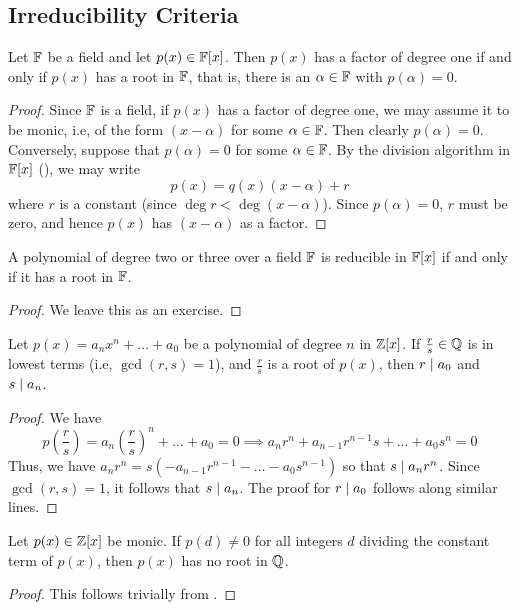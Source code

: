 \subsection{Irreducibility Criteria}

\begin{prop}
    Let $\mathbb{F}$ be a field and let $p(x) \in \mathbb{F}[x]$. Then $p(x)$ has a factor of degree one if and only if $p(x)$ has a root in $\mathbb{F}$, that is, there is an $\alpha \in \mathbb{F}$ with $p(\alpha) = 0$.
\end{prop}
\begin{proof}
    Since $\mathbb{F}$ is a field, if $p(x)$ has a factor of degree one, we may assume it to be monic, i.e, of the form $(x-\alpha)$ for some $\alpha \in \mathbb{F}$. Then clearly $p(\alpha) = 0$. Conversely, suppose that $p(\alpha) = 0$ for some $\alpha \in \mathbb{F}$. By the division algorithm in $\mathbb{F}[x]$ (), we may write
    \[
        p(x) = q(x) (x-\alpha) + r
    \]
    where $r$ is a constant (since $\deg r < \deg (x-\alpha)$). Since $p(\alpha) = 0$, $r$ must be zero, and hence $p(x)$ has $(x-\alpha)$ as a factor.
\end{proof}

\begin{prop}
    A polynomial of degree two or three over a field $\mathbb{F}$ is reducible in $\mathbb{F}[x]$ if and only if it has a root in $\mathbb{F}$.
\end{prop}
\begin{proof}
    We leave this as an exercise.
\end{proof}

\begin{prop}  \label{prop:rational-root-thm}
    Let $p(x) = a_nx^n + \ldots + a_0$ be a polynomial of degree $n$ in $\mathbb{Z}[x]$. If $\frac{r}{s} \in \mathbb{Q}$ is in lowest terms (i.e, $\gcd(r,s) = 1$), and $\frac{r}{s}$ is a root of $p(x)$, then $r \mid a_0$ and $s \mid a_n$.
\end{prop}
\begin{proof}
    We have
    \[
        p\left( \frac{r}{s} \right) = a_n \left( \frac{r}{s} \right)^n + \ldots + a_0 = 0 \implies a_n r^n + a_{n-1} r^{n-1}s + \ldots + a_0 s^n = 0
    \]
    Thus, we have $a_n r^n = s(-a_{n-1}r^{n-1} - \ldots - a_0 s^{n-1})$ so that $s \mid a_n r^n$. Since $\gcd(r,s) = 1$, it follows that $s \mid a_n$. The proof for $r \mid a_0$ follows along similar lines.
\end{proof}

\begin{cor}
    Let $p(x) \in \mathbb{Z}[x]$ be monic. If $p(d) \neq 0$ for all integers $d$ dividing the constant term of $p(x)$, then $p(x)$ has no root in $\mathbb{Q}$.
\end{cor}
\begin{proof}
    This follows trivially from .
\end{proof}

